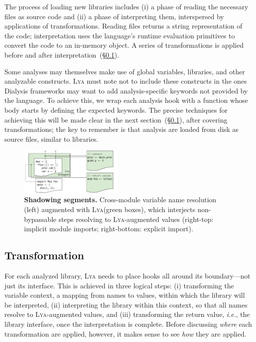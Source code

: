 \documentclass[letterpaper,twocolumn,10pt]{article}
\def\ie{{\em i.e.}, }
\newcommand{\sx}[1]{(\S\ref{#1})}
\newcommand{\sys}{{\scshape Lya}\xspace}
\newcommand{\pc}{PIC\xspace}
\newcommand{\fixme}[1]{{\color{red}#1}}
\begin{document}
The process of loading new libraries includes (i) a phase of reading the necessary files as source code and (ii) a phase of interpreting them, interspersed by applications of transformations.
Reading files returns a string representation of the code; interpretation uses the language's runtime evaluation primitives to convert the code to an in-memory object.
A series of transformations is applied before and after interpretation~\sx{two}.

Some analyses may themselves make use of global variables, libraries, and other analyzable constructs.
\sys must note not to include these constructs in the ones 
Dialysis frameworks may want to add analysis-specific keywords not provided by the language.
To achieve this, \fixme{we} wrap each analysis hook with a function whose body starts by defining the expected keywords.
The precise techniques for achieving this will be made clear in the next section~\sx{two}, after covering transformations;
  the key to remember is that analysis are loaded from disk as source files, similar to libraries.

\begin{figure}[t]
\centering 
\includegraphics[width=0.45\textwidth]{./figs/lya_shadowing.pdf}
\caption{
  \textbf{Shadowing segments.}
  \textmd{
  Cross-module variable name resolution (left) augmented with \sys (green boxes), which interjects non-bypassable steps resolving to \sys-augmented values (right-top: implicit module imports; right-bottom: explicit import).
  }
  \vspace{-4mm}
}
\label{fig:shadowing}
\end{figure}


\subsection{Transformation}
\label{two}

For each analyzed library, \sys needs to place hooks all around its boundary---not just its interface.
This is achieved in three logical steps:
(i) transforming the variable context, a mapping from names to values, within which the library will be interpreted,
(ii) interpreting the library within this context, so that all names resolve to \sys-augmented values, and
(iii) transforming the return value, \ie the library interface, once the interpretation is complete.
Before discussing \emph{where} each transformation are applied, however, it makes sense to see \emph{how} they are applied.
\end{document}
